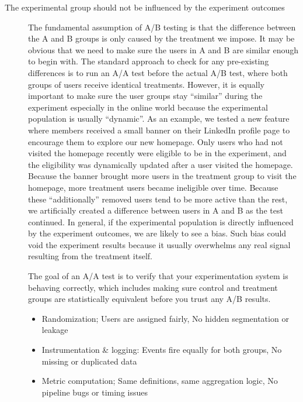 \begin{description}
\item [The experimental group should not be influenced by the experiment outcomes]

The fundamental assumption of A/B testing is that the difference between the A and B groups is only caused by the treatment we impose. 
It may be obvious that we need to make sure the users in A and B are similar enough to begin with. 
The standard approach to check for any pre-existing differences is to run an A/A test before the actual A/B test, where both groups of users receive identical treatments. 
However, it is equally important to make sure the user groups stay ``similar'' during the experiment especially in the online world because the experimental population is usually “dynamic”. 
As an example, we tested a new feature where members received a small banner on their LinkedIn profile page to encourage them to explore our new homepage. 
Only users who had not visited the homepage recently were eligible to be in the experiment, and the eligibility was dynamically updated after a user visited the homepage. 
Because the banner brought more users in the treatment group to visit the homepage, more treatment users became ineligible over time. 
Because these ``additionally'' removed users tend to be more active than the rest, we artificially created a difference between users in A and B as the test continued. 
In general, if the experimental population is directly influenced by the experiment outcomes, we are likely to see a bias. 
Such bias could void the experiment results because it usually overwhelms any real signal resulting from the treatment itself.

\begin{tcolorbox}[colback=green!5!white,colframe=green!80!black,title=\textbf{A/A test}]
The goal of an A/A test is to verify that your experimentation system is behaving correctly, which includes making sure control and treatment groups are statistically equivalent before you trust any A/B results.
\begin{itemize}
\item Randomization; Users are assigned fairly, No hidden segmentation or leakage

\item Instrumentation \& logging: Events fire equally for both groups, No missing or duplicated data

\item Metric computation; Same definitions, same aggregation logic,
No pipeline bugs or timing issues


\end{itemize}
\end{tcolorbox}
\end{description}
